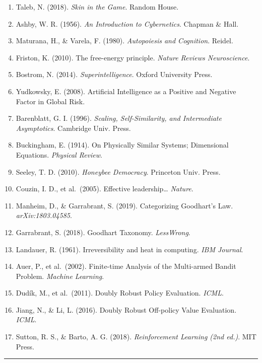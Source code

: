 \begin{enumerate}
\def\labelenumi{\arabic{enumi}.}
\tightlist
\item
  Taleb, N. (2018). \emph{Skin in the Game}. Random House.
\item
  Ashby, W. R. (1956). \emph{An Introduction to Cybernetics}. Chapman \&
  Hall.
\item
  Maturana, H., \& Varela, F. (1980). \emph{Autopoiesis and Cognition}.
  Reidel.
\item
  Friston, K. (2010). The free-energy principle. \emph{Nature Reviews
  Neuroscience}.
\item
  Bostrom, N. (2014). \emph{Superintelligence}. Oxford University Press.
\item
  Yudkowsky, E. (2008). Artificial Intelligence as a Positive and
  Negative Factor in Global Risk.
\item
  Barenblatt, G. I. (1996). \emph{Scaling, Self-Similarity, and
  Intermediate Asymptotics}. Cambridge Univ. Press.
\item
  Buckingham, E. (1914). On Physically Similar Systems; Dimensional
  Equations. \emph{Physical Review}.
\item
  Seeley, T. D. (2010). \emph{Honeybee Democracy}. Princeton Univ.
  Press.
\item
  Couzin, I. D., et al.~(2005). Effective leadership\ldots{}
  \emph{Nature}.
\item
  Manheim, D., \& Garrabrant, S. (2019). Categorizing Goodhart's Law.
  \emph{arXiv:1803.04585}.
\item
  Garrabrant, S. (2018). Goodhart Taxonomy. \emph{LessWrong}.
\item
  Landauer, R. (1961). Irreversibility and heat in computing. \emph{IBM
  Journal}.
\item
  Auer, P., et al.~(2002). Finite-time Analysis of the Multi-armed
  Bandit Problem. \emph{Machine Learning}.
\item
  Dudík, M., et al.~(2011). Doubly Robust Policy Evaluation.
  \emph{ICML}.
\item
  Jiang, N., \& Li, L. (2016). Doubly Robust Off-policy Value
  Evaluation. \emph{ICML}.
\item
  Sutton, R. S., \& Barto, A. G. (2018). \emph{Reinforcement Learning
  (2nd ed.)}. MIT Press.
\end{enumerate}

\begin{center}\rule{0.5\linewidth}{0.5pt}\end{center}

